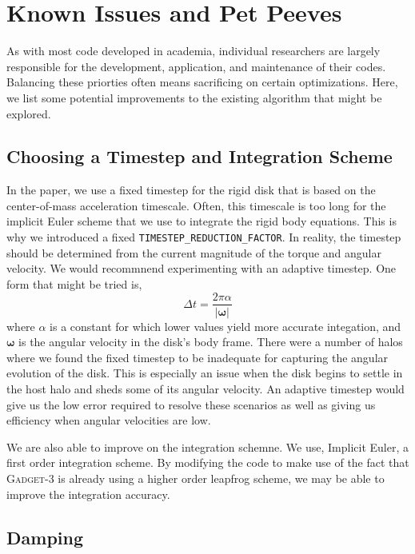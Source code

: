 \section{Known Issues and Pet Peeves}

As with most code developed in academia, individual researchers are largely responsible for the development, application, and maintenance of their codes. Balancing these priorties often means sacrificing on certain optimizations. Here, we list some potential improvements to the existing algorithm that might be explored.

\subsection{Choosing a Timestep and Integration Scheme}

In the paper, we use a fixed timestep for the rigid disk that is based on the center-of-mass acceleration timescale. Often, this timescale is too long for the implicit Euler scheme that we use to integrate the rigid body equations. This is why we introduced a fixed \texttt{TIMESTEP\_REDUCTION\_FACTOR}. In reality, the timestep should be determined from the current magnitude of the torque and angular velocity. We would recommnend experimenting with an adaptive timestep. One form that might be tried is,
\begin{equation}
\Delta t = \frac{2 \pi \alpha}{\vert \boldsymbol \omega \vert}
\end{equation}
where $\alpha$ is a constant for which lower values yield more accurate integation, and $\boldsymbol \omega$ is the angular velocity in the disk's body frame. There were a number of halos where we found the fixed timestep to be inadequate for capturing the angular evolution of the disk. This is especially an issue when the disk begins to settle in the host halo and sheds some of its angular velocity. An adaptive timestep would give us the low error required to resolve these scenarios as well as giving us efficiency when angular velocities are low.

We are also able to improve on the integration schemne. We use, Implicit Euler, a first order integration scheme. By modifying the code to make use of the fact that \textsc{Gadget-3} is already using a higher order leapfrog scheme, we may be able to improve the integration accuracy.

\subsection{Damping}

